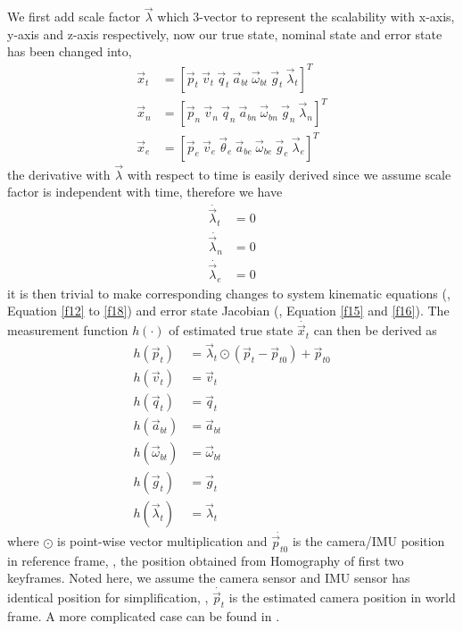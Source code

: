 We first add scale factor $\vec{\lambda}$ which 3-vector to represent the scalability with x-axis, y-axis and z-axis respectively, now our true state, nominal state and error state has been changed into,
\begin{align}
	\vec{x}_t &= \left[ \vec{p}_t \ \vec{v}_t \ \vec{q}_t \ \vec{a}_{bt} \ \vec{\omega}_{bt} \ \vec{g}_{t} \ \vec{\lambda}_{t} \right]^T \\
	\vec{x}_n &= \left[ \vec{p}_n \ \vec{v}_n \ \vec{q}_n \ \vec{a}_{bn} \ \vec{\omega}_{bn} \ \vec{g}_{n} \ \vec{\lambda}_{n} \right]^T \\
	\vec{x}_e &= \left[ \vec{p}_e \ \vec{v}_e \ \vec{\theta}_e \ \vec{a}_{be} \ \vec{\omega}_{be} \ \vec{g}_{e} \ \vec{\lambda}_{e} \right]^T 
\end{align}
the derivative with $\vec{\lambda}$ with respect to time is easily derived since we assume scale factor is independent with time, therefore we have
\begin{align}
	\dot{\vec{\lambda}_t} &= 0 \\
	\dot{\vec{\lambda}_n} &= 0 \\
	\dot{\vec{\lambda}_e} &= 0 
\end{align}
it is then trivial to make corresponding changes to system kinematic equations (\eg, Equation \ref{f12} to \ref{f18}) and error state Jacobian (\eg, Equation \ref{f15} and \ref{f16}). The measurement function $h(\cdot)$ of estimated true state $\dot{\vec{x}_t}$ can then be derived as
\begin{align}
	\label{f23}
	h(\vec{p}_t) &= \vec{\lambda}_t \odot (\vec{p}_t - \vec{p}_{t0}) + \vec{p}_{t0}\\
	\label{f24}
	h(\vec{v}_t) &= \vec{v}_t\\
	\label{f25}
	h(\vec{q}_t) &= \vec{q}_t\\
	\label{f26}
	h(\vec{a}_{bt}) &= \vec{a}_{bt} \\
	\label{f27}
	h(\vec{\omega}_{bt}) &= \vec{\omega}_{bt} \\ 
	\label{f28}
	h(\vec{g}_t) &= \vec{g}_t \\
	\label{f29}
	h(\vec{\lambda}_t) &= \vec{\lambda}_t 
\end{align}
where $\odot$ is point-wise vector multiplication and $\dot{\vec{p}_{t0}}$ is the camera/IMU position in reference frame, \ie, the position obtained from Homography of first two keyframes. Noted here, we assume the camera sensor and IMU sensor has identical position for simplification, \ie, $\dot{\vec{p}_t}$ is the estimated camera position in world frame. A more complicated case can be found in \cite{lynen2013robust}.

